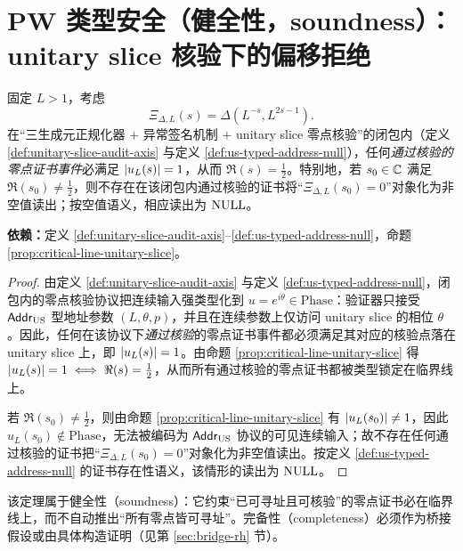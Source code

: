 \section{PW 类型安全（健全性，soundness）：unitary slice 核验下的偏移拒绝}

\begin{theorem}\label{thm:type-safety-offcritical}
固定 $L>1$，考虑
$$
\Xi_{\Delta,L}(s)=\Delta(L^{-s},L^{2s-1}).
$$
在“三生成元正规化器 $+$ 异常签名机制 $+$ unitary slice 零点核验”的闭包内（定义 \ref{def:unitary-slice-audit-axis} 与定义 \ref{def:us-typed-address-null}），任何\emph{通过核验的零点证书事件}必满足 $\left\lvert u_L(s)\right\rvert=1$，从而 $\Re(s)=\tfrac12$。特别地，若 $s_0\in\mathbb{C}$ 满足 $\Re(s_0)\neq \tfrac12$，则不存在在该闭包内通过核验的证书将“$\Xi_{\Delta,L}(s_0)=0$”对象化为非空值读出；按空值语义，相应读出为 $\mathrm{NULL}$。
\par\noindent\textnormal{\textbf{依赖：}定义 \ref{def:unitary-slice-audit-axis}--\ref{def:us-typed-address-null}，命题 \ref{prop:critical-line-unitary-slice}。}
\end{theorem}

\begin{proof}
由定义 \ref{def:unitary-slice-audit-axis} 与定义 \ref{def:us-typed-address-null}，闭包内的零点核验协议把连续输入强类型化到 $u=e^{i\theta}\in\mathrm{Phase}$：验证器只接受 $\mathsf{Addr}_{\mathrm{US}}$ 型地址参数 $(L,\theta,p)$，并且在连续参数上仅访问 unitary slice 的相位 $\theta$。因此，任何在该协议下\emph{通过核验}的零点证书事件都必须满足其对应的核验点落在 unitary slice 上，即 $\left\lvert u_L(s)\right\rvert=1$。由命题 \ref{prop:critical-line-unitary-slice} 得 $\left\lvert u_L(s)\right\rvert=1\iff \Re(s)=\tfrac12$，从而所有通过核验的零点证书都被类型锁定在临界线上。\par
若 $\Re(s_0)\neq\tfrac12$，则由命题 \ref{prop:critical-line-unitary-slice} 有 $\left\lvert u_L(s_0)\right\rvert\neq 1$，因此 $u_L(s_0)\notin\mathrm{Phase}$，无法被编码为 $\mathsf{Addr}_{\mathrm{US}}$ 协议的可见连续输入；故不存在任何通过核验的证书把“$\Xi_{\Delta,L}(s_0)=0$”对象化为非空值读出。按定义 \ref{def:us-typed-address-null} 的证书存在性语义，该情形的读出为 $\mathrm{NULL}$。
\end{proof}

该定理属于健全性（soundness）：它约束“已可寻址且可核验”的零点证书必在临界线上，而不自动推出“所有零点皆可寻址”。完备性（completeness）必须作为桥接假设或由具体构造证明（见第 \ref{sec:bridge-rh} 节）。

